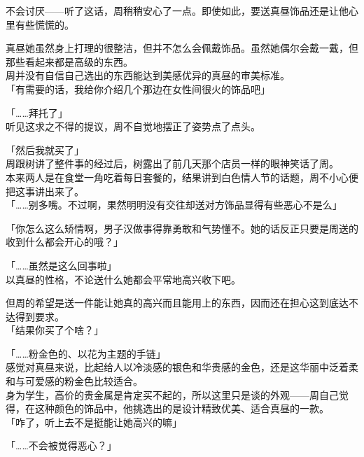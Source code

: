 不会讨厌——听了这话，周稍稍安心了一点。即使如此，要送真昼饰品还是让他心里有些慌慌的。

真昼她虽然身上打理的很整洁，但并不怎么会佩戴饰品。虽然她偶尔会戴一戴，但那些看起来都是高级的东西。\\

周并没有自信自己选出的东西能达到美感优异的真昼的审美标准。\\

「有需要的话，我给你介绍几个那边在女性间很火的饰品吧」

「……拜托了」\\

听见这求之不得的提议，周不自觉地摆正了姿势点了点头。\\

\vspace{2\baselineskip}

「然后我就买了」\\

周跟树讲了整件事的经过后，树露出了前几天那个店员一样的眼神笑话了周。\\

本来两人是在食堂一角吃着每日套餐的，结果讲到白色情人节的话题，周不小心便把这事讲出来了。\\

「……别多嘴。不过啊，果然明明没有交往却送对方饰品显得有些恶心不是么」

「你怎么这么矫情啊，男子汉做事得靠勇敢和气势懂不。她的话反正只要是周送的收到什么都会开心的哦？」

「……虽然是这么回事啦」\\

以真昼的性格，不论送什么她都会平常地高兴收下吧。

但周的希望是送一件能让她真的高兴而且能用上的东西，因而还在担心这到底达不达得到要求。\\

「结果你买了个啥？」

「……粉金色的、以花为主题的手链」\\

感觉对真昼来说，比起给人以冷淡感的银色和华贵感的金色，还是这华丽中泛着柔和与可爱感的粉金色比较适合。\\

身为学生，高价的贵金属是肯定买不起的，所以这里只是谈的外观——周自己觉得，在这种颜色的饰品中，他挑选出的是设计精致优美、适合真昼的一款。\\

「咋了，听上去不是挺能让她高兴的嘛」

「……不会被觉得恶心？」

